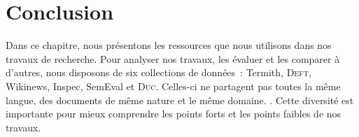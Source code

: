 
  \section{Conclusion}
  \label{sec:main-data_description-conclusion}
    Dans ce chapitre, nous présentons les ressources que nous utilisons dans nos
    travaux de recherche. Pour analyser nos travaux, les évaluer et les
    comparer à d'autres, nous disposons de six collections de données~: Termith,
    \textsc{Deft}, Wikinews, Inspec, SemEval et \textsc{Duc}. Celles-ci ne
    partagent pas toutes la même langue, des documents de même nature et le même
    domaine. .
    Cette diversité est importante pour mieux comprendre les points forts et les
    points faibles de nos travaux.

